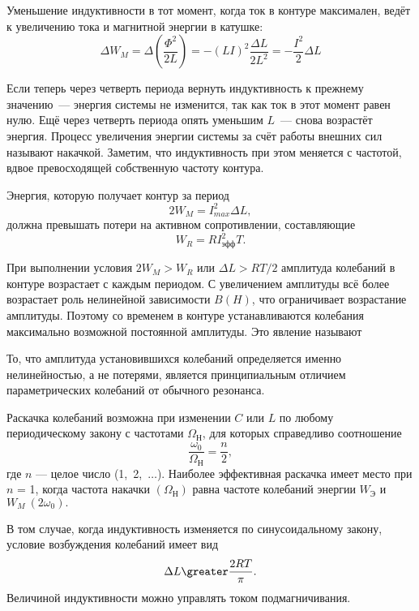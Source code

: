 Уменьшение индуктивности в тот момент, когда ток в контуре максимален, ведёт к увеличению тока и магнитной энергии в катушке: 
\begin{equation*}
	\Delta W_M = \Delta \left(\frac{\Phi^2}{2L}\right) = - (LI)^2\frac{\Delta L}{2L^2} = - \frac{I^2}{2}\Delta L
\end{equation*}

Если теперь через четверть периода вернуть индуктивность к прежнему значению~--- энергия системы не изменится, так как ток в этот момент равен нулю. Ещё через четверть периода опять уменьшим $L$~--- снова возрастёт энергия. Процесс увеличения энергии системы за счёт работы внешних сил называют накачкой. Заметим, что индуктивность при этом меняется с частотой, вдвое превосходящей собственную частоту контура. 

Энергия, которую получает контур за период
\begin{equation*}
	2W_M = I^2_{max} \Delta L,
\end{equation*}
должна превышать потери на активном сопротивлении, составляющие 
\begin{equation*}
	W_R = RI^2_\text{эфф}T.
\end{equation*}

При выполнении условия $2W_M \greater W_R$ или $\Delta L \greater RT/2$ амплитуда колебаний в контуре возрастает с каждым периодом. С увеличением амплитуды всё более возрастает роль нелинейной зависимости $B(H)$, что ограничивает возрастание амплитуды. Поэтому со временем в контуре устанавливаются колебания максимально возможной постоянной амплитуды. Это явление называют 

То, что амплитуда установившихся колебаний определяется именно нелинейностью, а не потерями, является принципиальным отличием параметрических колебаний от обычного резонанса. 

Раскачка колебаний возможна при изменении $C$ или $L$ по любому периодическому закону с частотами $\Omega_\text{Н}$, для которых справедливо соотношение 
\begin{equation*}
	\frac{\omega_0}{\Omega_\text{Н}} = \frac{n}{2},
\end{equation*}
где $n$ --- целое число (1,~2,~$\dots$). Наиболее эффективная раскачка имеет место при $n$ = 1, когда частота накачки $(\Omega_\text{Н})$ равна частоте колебаний энергии $W_\text{Э}$ и $W_M~(2\omega_0).$

 В том случае, когда индуктивность изменяется по синусоидальному закону, условие возбуждения колебаний имеет вид
\begin{equation}
	\eqmark{4.6.3}
	\Delta L \greater \frac{2RT}{\pi}.
\end{equation} 
Величиной индуктивности можно управлять током подмагничивания. 

